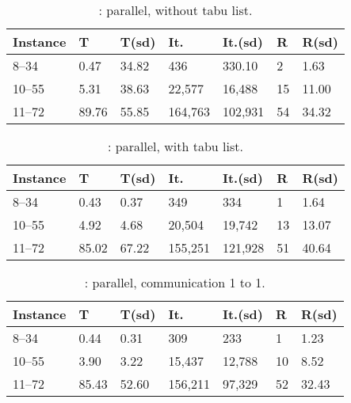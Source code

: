 \begin{table}[h]
	\centering 
	\renewcommand{\arraystretch}{1}
	\begin{tabular}{p{2cm}|R{1.2cm}R{1.2cm}|R{1.5cm}R{1.5cm}|R{0.8cm}R{1.2cm}}
		\hline 	
		{\bf Instance} & T & T(sd) & It. & It.(sd) & R & R(sd)\\
		\hline
		8--34 & 0.47 & 34.82 & 436 & 330.10 & 2 & 1.63\\
		10--55 & 5.31 & 38.63 & 22,577 & 16,488 & 15 & 11.00\\
		11--72 & 89.76 & 55.85 & 164,763 & 102,931 & 54 & 34.32\\
		\hline
	\end{tabular}
	\caption{\gr: parallel, without tabu list.}
	\label{tab:golomb_par_notabu}
\end{table}

\begin{table}[h]
	\centering 
	\renewcommand{\arraystretch}{1}
	\begin{tabular}{p{2cm}|R{1.2cm}R{1.2cm}|R{1.5cm}R{1.5cm}|R{0.8cm}R{1.2cm}}
		\hline 	
		{\bf Instance} & T & T(sd) & It. & It.(sd) & R & R(sd)\\
		\hline
		8--34 & 0.43 & 0.37 & 349 & 334 & 1 & 1.64\\
		10--55 & 4.92 & 4.68 & 20,504 & 19,742 & 13 & 13.07\\
		11--72 & 85.02 & 67.22 & 155,251 & 121,928 & 51 & 40.64\\
		\hline
	\end{tabular}
	\caption{\gr: parallel, with tabu list.}
	\label{tab:golomb_par_tabu}
\end{table}

\begin{table}[h]
	\centering 
	\renewcommand{\arraystretch}{1}
	\begin{tabular}{p{2cm}|R{1.2cm}R{1.2cm}|R{1.5cm}R{1.5cm}|R{0.8cm}R{1.2cm}}
		\hline 	
		{\bf Instance} & T & T(sd) & It. & It.(sd) & R & R(sd)\\
		\hline
		8--34 & 0.44 & 0.31 & 309 & 233 & 1 & 1.23\\
		10--55 & 3.90 & 3.22 & 15,437 & 12,788 & 10 & 8.52\\
		11--72 & 85.43 & 52.60 & 156,211 & 97,329 & 52 & 32.43\\
		\hline
	\end{tabular}
	\caption{\gr: parallel, communication 1 to 1.}
	\label{tab:golomb_par_1-1}
\end{table}

